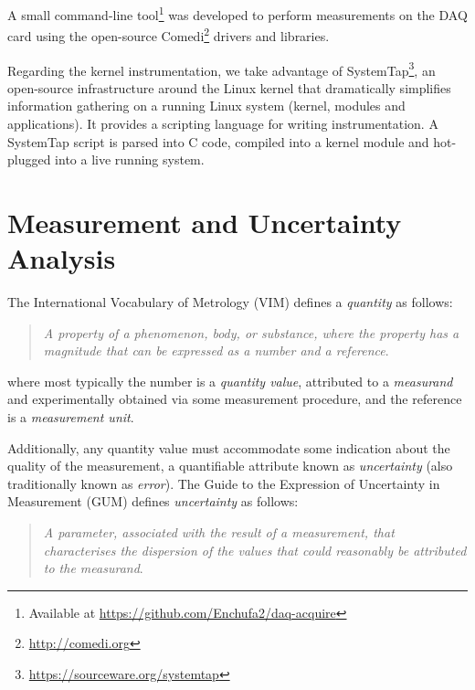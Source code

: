 \documentclass[twoside,nohyper]{tufte-book}
\begin{document}
A small command-line tool\footnote{Available at \url{https://github.com/Enchufa2/daq-acquire}} was developed to perform measurements on the DAQ card using the open-source Comedi\footnote{\url{http://comedi.org}} drivers and libraries.

Regarding the kernel instrumentation, we take advantage of SystemTap\footnote{\href{(https://sourceware.org/systemtap)}{https://sourceware.org/systemtap}}, an open-source infrastructure around the Linux kernel that dramatically simplifies information gathering on a running Linux system (kernel, modules and applications). It provides a scripting language for writing instrumentation. A SystemTap script is parsed into C code, compiled into a kernel module and hot-plugged into a live running system.

\hypertarget{measurement-and-uncertainty-analysis}{%
\section{Measurement and Uncertainty Analysis}\label{measurement-and-uncertainty-analysis}}

The International Vocabulary of Metrology (VIM) defines a \emph{quantity} as follows\cite[0pt]{VIM:2012}:

\begin{quote}
\emph{A property of a phenomenon, body, or substance, where the property has a magnitude that can be expressed as a number and a reference}.
\end{quote}

\noindent where most typically the number is a \emph{quantity value}, attributed to a \emph{measurand} and experimentally obtained via some measurement procedure, and the reference is a \emph{measurement unit}.

Additionally, any quantity value must accommodate some indication about the quality of the measurement, a quantifiable attribute known as \emph{uncertainty} (also traditionally known as \emph{error}). The Guide to the Expression of Uncertainty in Measurement (GUM) defines \emph{uncertainty} as follows\cite[0pt]{GUM:2008}:


\begin{quote}
\emph{A parameter, associated with the result of a measurement, that characterises the dispersion of the values that could reasonably be attributed to the measurand}.
\end{quote}
\end{document}
